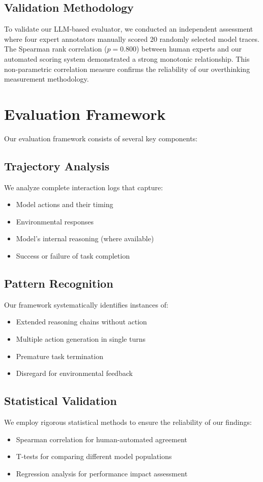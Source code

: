 \subsection{Validation Methodology}
To validate our LLM-based evaluator, we conducted an independent assessment where four expert annotators manually scored 20 randomly selected model traces. The Spearman rank correlation ($p = 0.800$) between human experts and our automated scoring system demonstrated a strong monotonic relationship. This non-parametric correlation measure confirms the reliability of our overthinking measurement methodology.

\section{Evaluation Framework}
\label{sec:eval_framework}

Our evaluation framework consists of several key components:

\subsection{Trajectory Analysis}
We analyze complete interaction logs that capture:
\begin{itemize}
    \item Model actions and their timing
    \item Environmental responses
    \item Model's internal reasoning (where available)
    \item Success or failure of task completion
\end{itemize}

\subsection{Pattern Recognition}
Our framework systematically identifies instances of:
\begin{itemize}
    \item Extended reasoning chains without action
    \item Multiple action generation in single turns
    \item Premature task termination
    \item Disregard for environmental feedback
\end{itemize}

\subsection{Statistical Validation}
We employ rigorous statistical methods to ensure the reliability of our findings:
\begin{itemize}
    \item Spearman correlation for human-automated agreement
    \item T-tests for comparing different model populations
    \item Regression analysis for performance impact assessment
\end{itemize}

